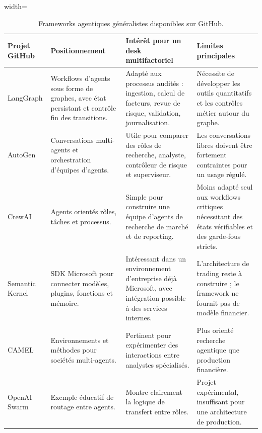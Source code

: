 \begin{table}[H]
\centering
\caption{Frameworks agentiques généralistes disponibles sur GitHub.}
\label{tab:frameworks-agents}
\scriptsize
\begin{adjustbox}{width=\textwidth}
\begin{tabular}{p{}p{}p{}p{}}
\toprule
\textbf{Projet GitHub} & \textbf{Positionnement} & \textbf{Intérêt pour un desk multifactoriel} & \textbf{Limites principales} \\
\midrule
LangGraph \citep{githubLangGraph} & Workflows d'agents sous forme de graphes, avec état persistant et contrôle fin des transitions. & Adapté aux processus audités : ingestion, calcul de facteurs, revue de risque, validation, journalisation. & Nécessite de développer les outils quantitatifs et les contrôles métier autour du graphe. \\
AutoGen \citep{githubAutoGen} & Conversations multi-agents et orchestration d'équipes d'agents. & Utile pour comparer des rôles de recherche, analyste, contrôleur de risque et superviseur. & Les conversations libres doivent être fortement contraintes pour un usage régulé. \\
CrewAI \citep{githubCrewAI} & Agents orientés rôles, tâches et processus. & Simple pour construire une équipe d'agents de recherche de marché et de reporting. & Moins adapté seul aux workflows critiques nécessitant des états vérifiables et des garde-fous stricts. \\
Semantic Kernel \citep{githubSemanticKernel} & SDK Microsoft pour connecter modèles, plugins, fonctions et mémoire. & Intéressant dans un environnement d'entreprise déjà Microsoft, avec intégration possible à des services internes. & L'architecture de trading reste à construire ; le framework ne fournit pas de modèle financier. \\
CAMEL \citep{githubCamel} & Environnements et méthodes pour sociétés multi-agents. & Pertinent pour expérimenter des interactions entre analystes spécialisés. & Plus orienté recherche agentique que production financière. \\
OpenAI Swarm \citep{githubSwarm} & Exemple éducatif de routage entre agents. & Montre clairement la logique de transfert entre rôles. & Projet expérimental, insuffisant pour une architecture de production. \\
\bottomrule
\end{tabular}
\end{adjustbox}
\end{table}


